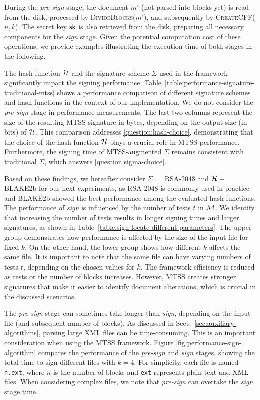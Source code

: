 \documentclass[12pt]{article}
\begin{document}
During the \textit{pre-sign} stage, the document $m'$ (not parsed into blocks yet) is read from the disk, processed by \textsc{DivideBlocks($m'$)}, and subsequently by \textsc{CreateCFF($n, k$)}. The secret key $\mathsf{sk}$ is also retrieved from the disk, preparing all necessary components for the \textit{sign} stage. Given the potential computation cost of these operations, we provide examples illustrating the execution time of both stages in the following.

The hash function $\mathcal{H}$ and the signature scheme $\Sigma$ used in the framework significantly impact the signing performance. Table~\ref{table:performance-signature-traditional-mtss} shows a performance comparison of different signature schemes and hash functions in the context of our implementation. We do not consider the \textit{pre-sign} stage in performance measurements. The last two columns represent the size of the resulting MTSS signature in bytes, depending on the output size (in bits) of $\mathcal{H}$. This comparison addresses \ref{question:hash-choice}, demonstrating that the choice of the hash function $\mathcal{H}$ plays a crucial role in MTSS performance. Furthermore, the signing time of MTSS-augmented $\Sigma$ remains consistent with traditional $\Sigma$, which answers \ref{question:sigma-choice}.



Based on these findings, we hereafter consider $\Sigma =$ RSA-2048 and $\mathcal{H} =$ BLAKE2b for our next experiments, as RSA-2048 is commonly used in practice and BLAKE2b showed the best performance among the evaluated hash functions. The performance of \textit{sign} is influenced by the number of tests $t$ in $\mathcal{M}$. We identify that increasing the number of tests results in longer signing times and larger signatures, as shown in Table~\ref{table:sign-locate-different-parameters}. The upper group demonstrates how performance is affected by the size of the input file for fixed $k$. On the other hand, the lower group shows how different $k$ affects the same file. It is important to note that the same file can have varying numbers of tests $t$, depending on the chosen values for $k$. The framework efficiency is reduced as tests or the number of blocks increases. However, MTSS creates stronger signatures that make it easier to identify document alterations, which is crucial in the discussed scenarios.



The \textit{pre-sign} stage can sometimes take longer than \textit{sign}, depending on the input file (and subsequent number of blocks). As discussed in Sect.~\ref{sec:auxiliary-algorithms}, parsing large XML files can be time-consuming. This is an important consideration when using the MTSS framework. Figure \ref{fig:performance-sign-algorithm} compares the performance of the \textit{pre-sign} and \textit{sign} stages, showing the total time to sign different files with $k = 4$. For simplicity, each file is named \texttt{n.ext}, where $n$ is the number of blocks and \texttt{ext} represents plain text and XML files. When considering complex files, we note that \textit{pre-sign} can overtake the \textit{sign} stage time.
\end{document}

